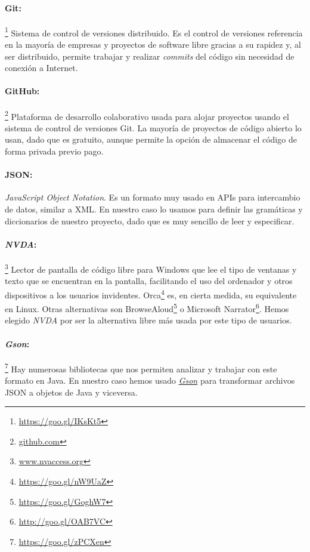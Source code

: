  \paragraph{Git:}\footnote{\url{https://goo.gl/IKsKt5}} Sistema de control de versiones distribuido. Es el control de versiones referencia en la mayoría de empresas y proyectos de software libre gracias a su rapidez y, al ser distribuido, permite trabajar y realizar \textit{commits} del código sin necesidad de conexión a Internet.

 \paragraph{GitHub:}\footnote{\url{github.com}} Plataforma de desarrollo colaborativo usada para alojar proyectos usando el sistema de control de versiones Git. La mayoría de proyectos de código abierto lo usan, dado que es gratuito, aunque permite la opción de almacenar el código de forma privada previo pago.

\paragraph{JSON:} \textit{JavaScript Object Notation}. Es un formato muy usado en APIs para intercambio de datos, similar a XML. En nuestro caso lo usamos para definir las gramáticas y diccionarios de nuestro proyecto, dado que es muy sencillo de leer y especificar.

\paragraph{\textit{NVDA}:}\footnote{\url{www.nvaccess.org}} Lector de pantalla de código libre para Windows que lee el tipo de ventanas y texto que se encuentran en la pantalla, facilitando el uso del ordenador y otros dispositivos a los usuarios invidentes. 
Orca\footnote{\url{https://goo.gl/nW9UaZ}} es, en cierta medida, su equivalente en Linux. Otras alternativas son BrowseAloud\footnote{\url{https://goo.gl/GoghW7}} o Microsoft Narrator\footnote{\url{http://goo.gl/OAB7VC}}. Hemos elegido \textit{NVDA} por ser la alternativa libre más usada por este tipo de usuarios.

\paragraph{\textit{Gson}:}\footnote{\url{https://goo.gl/zPCXen}} Hay numerosas bibliotecas que nos permiten analizar y trabajar con este formato en Java. En nuestro caso hemos usado \href{https://goo.gl/zPCXen}{\textit{Gson}} para transformar archivos JSON a objetos de Java y viceversa.

